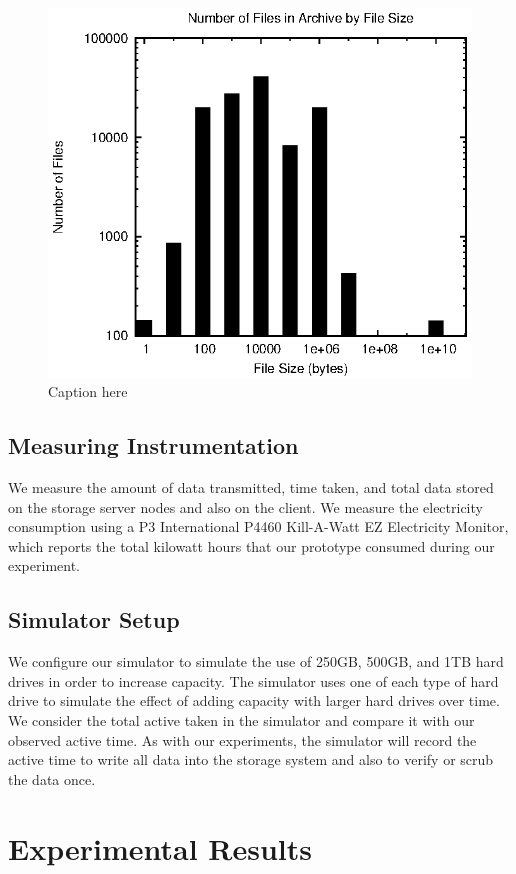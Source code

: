 \begin{figure}[!ht]
\includegraphics[width=\linewidth]{fig5.eps}
\caption{Caption here}
\label{fig5}
\end{figure}

\subsection{Measuring Instrumentation}
We measure the amount of data transmitted, time taken, and total data stored on the storage server nodes and also on the client.  We measure the electricity consumption using a  P3 International P4460 Kill-A-Watt EZ Electricity Monitor, which reports the total kilowatt hours that our prototype consumed during our experiment.

\subsection{Simulator Setup}
We configure our simulator to simulate the use of 250GB, 500GB, and 1TB hard drives in order to increase capacity.  The simulator uses one of each type of hard drive to simulate the effect of adding capacity with larger hard drives over time.  We consider the total active taken in the simulator and compare it with our observed active time.  As with our experiments, the simulator will record the active time to write all data into the storage system and also to verify or scrub the data once.

\section{Experimental Results}


